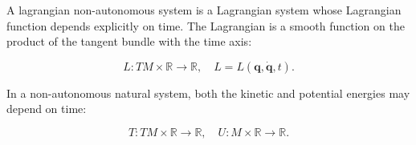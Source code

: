 A lagrangian non-autonomous system is a Lagrangian system whose Lagrangian function depends explicitly on time. The Lagrangian is a smooth function on the product of the tangent bundle with the time axis:

$$L: TM \times \mathbb{R} \to \mathbb{R}, \quad L = L(\mathbf{q}, \dot{\mathbf{q}}, t).$$

In a non-autonomous natural system, both the kinetic and potential energies may depend on time:

$$T: TM \times \mathbb{R} \to \mathbb{R}, \quad U: M \times \mathbb{R} \to \mathbb{R}.$$
